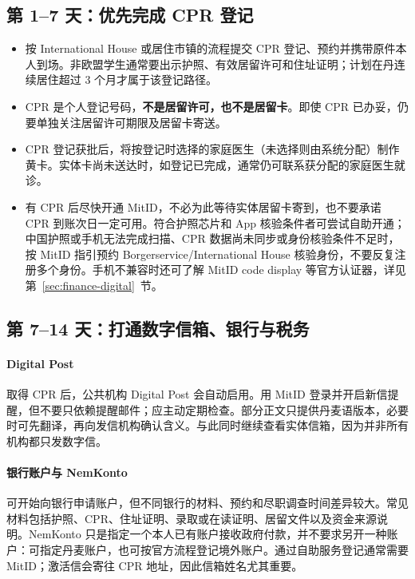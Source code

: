 \subsection{第 1--7 天：优先完成 CPR 登记}

\begin{itemize}[leftmargin=2em,itemsep=3pt]
  \item 按 International House 或居住市镇的流程提交 CPR 登记、预约并携带原件本人到场。非欧盟学生通常要出示护照、有效居留许可和住址证明；计划在丹连续居住超过 3 个月才属于该登记路径。
  \item CPR 是个人登记号码，\textbf{不是居留许可，也不是居留卡}。即使 CPR 已办妥，仍要单独关注居留许可期限及居留卡寄送。
  \item CPR 登记获批后，将按登记时选择的家庭医生（未选择则由系统分配）制作黄卡。实体卡尚未送达时，如登记已完成，通常仍可联系获分配的家庭医生就诊。
  \item 有 CPR 后尽快开通 MitID，不必为此等待实体居留卡寄到，也不要承诺 CPR 到账次日一定可用。符合护照芯片和 App 核验条件者可尝试自助开通；中国护照或手机无法完成扫描、CPR 数据尚未同步或身份核验条件不足时，按 MitID 指引预约 Borgerservice/International House 核验身份，不要反复注册多个身份。手机不兼容时还可了解 MitID code display 等官方认证器，详见第~\ref{sec:finance-digital}~节。
\end{itemize}

\subsection{第 7--14 天：打通数字信箱、银行与税务}

\paragraph{Digital Post}
取得 CPR 后，公共机构 Digital Post 会自动启用。用 MitID 登录并开启新信提醒，但不要只依赖提醒邮件；应主动定期检查。部分正文只提供丹麦语版本，必要时可先翻译，再向发信机构确认含义。与此同时继续查看实体信箱，因为并非所有机构都只发数字信。

\paragraph{银行账户与 NemKonto}
可开始向银行申请账户，但不同银行的材料、预约和尽职调查时间差异较大。常见材料包括护照、CPR、住址证明、录取或在读证明、居留文件以及资金来源说明。NemKonto 只是指定一个本人已有账户接收政府付款，并不要求另开一种账户：可指定丹麦账户，也可按官方流程登记境外账户。通过自助服务登记通常需要 MitID；激活信会寄往 CPR 地址，因此信箱姓名尤其重要。

